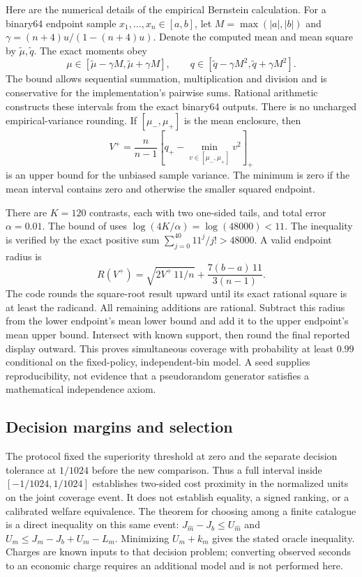 Here are the numerical details of the empirical Bernstein calculation. For a binary64 endpoint sample $x_1,\ldots,x_n\in[a,b]$, let $M=\max(|a|,|b|)$ and $\gamma=(n+4)u/(1-(n+4)u)$. Denote the computed mean and mean square by $\widetilde\mu,\widetilde q$. The exact moments obey
\[
 \mu\in[\widetilde\mu-\gamma M,\widetilde\mu+\gamma M],\qquad
 q\in[\widetilde q-\gamma M^2,\widetilde q+\gamma M^2].
\]
The bound allows sequential summation, multiplication and division and is conservative for the implementation's pairwise sums. Rational arithmetic constructs these intervals from the exact binary64 outputs. There is no uncharged empirical-variance rounding. If $[\mu_-,\mu_+]$ is the mean enclosure, then
\[
 V^+=\frac{n}{n-1}\left[q_+-\min_{v\in[\mu_-,\mu_+]}v^2\right]_+
\]
is an upper bound for the unbiased sample variance. The minimum is zero if the mean interval contains zero and otherwise the smaller squared endpoint.

There are $K=120$ contrasts, each with two one-sided tails, and total error $\alpha=0.01$. The bound of \citet{maurer2009} uses $\log(4K/\alpha)=\log(48000)<11$. The inequality is verified by the exact positive sum $\sum_{j=0}^{40}11^j/j!>48000$. A valid endpoint radius is
\[
 R(V^+)=\sqrt{2V^+\,11/n}+\frac{7(b-a)\,11}{3(n-1)}.
\]
The code rounds the square-root result upward until its exact rational square is at least the radicand. All remaining additions are rational. Subtract this radius from the lower endpoint's mean lower bound and add it to the upper endpoint's mean upper bound. Intersect with known support, then round the final reported display outward. This proves simultaneous coverage with probability at least $0.99$ conditional on the fixed-policy, independent-bin model. A seed supplies reproducibility, not evidence that a pseudorandom generator satisfies a mathematical independence axiom.

\subsection{Decision margins and selection}
The protocol fixed the superiority threshold at zero and the separate decision tolerance at $1/1024$ before the new comparison. Thus a full interval inside $[-1/1024,1/1024]$ establishes two-sided cost proximity in the normalized units on the joint coverage event. It does not establish equality, a signed ranking, or a calibrated welfare equivalence. The theorem for choosing among a finite catalogue is a direct inequality on this same event: $J_{\widehat m}-J_b\le U_{\widehat m}$ and $U_m\le J_m-J_b+U_m-L_m$. Minimizing $U_m+k_m$ gives the stated oracle inequality. Charges are known inputs to that decision problem; converting observed seconds to an economic charge requires an additional model and is not performed here.

